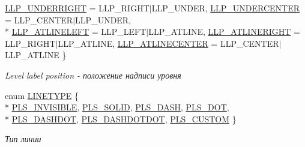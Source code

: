 \begin{DoxyCompactItemize}
\hyperlink{namespacexyplot_aa9c170d2faee24c85ccb4ae1b717cf6fa7056ae1976fd91d8da8738334dd15929}{L\-L\-P\-\_\-\-U\-N\-D\-E\-R\-R\-I\-G\-H\-T} = L\-L\-P\-\_\-\-R\-I\-G\-H\-T$\vert$\-L\-L\-P\-\_\-\-U\-N\-D\-E\-R, 
\hyperlink{namespacexyplot_aa9c170d2faee24c85ccb4ae1b717cf6fa082baefa8d7275b1aae57b461fe6785b}{L\-L\-P\-\_\-\-U\-N\-D\-E\-R\-C\-E\-N\-T\-E\-R} = L\-L\-P\-\_\-\-C\-E\-N\-T\-E\-R$\vert$\-L\-L\-P\-\_\-\-U\-N\-D\-E\-R, 
\\*
\hyperlink{namespacexyplot_aa9c170d2faee24c85ccb4ae1b717cf6fad082c1ad05eeb3c15e0c6b77d6cce9d4}{L\-L\-P\-\_\-\-A\-T\-L\-I\-N\-E\-L\-E\-F\-T} = L\-L\-P\-\_\-\-L\-E\-F\-T$\vert$\-L\-L\-P\-\_\-\-A\-T\-L\-I\-N\-E, 
\hyperlink{namespacexyplot_aa9c170d2faee24c85ccb4ae1b717cf6faa8ae07e99eba567ea01eb2664016d252}{L\-L\-P\-\_\-\-A\-T\-L\-I\-N\-E\-R\-I\-G\-H\-T} = L\-L\-P\-\_\-\-R\-I\-G\-H\-T$\vert$\-L\-L\-P\-\_\-\-A\-T\-L\-I\-N\-E, 
\hyperlink{namespacexyplot_aa9c170d2faee24c85ccb4ae1b717cf6fa12fe073bd3142bfa8d390720d3a76eff}{L\-L\-P\-\_\-\-A\-T\-L\-I\-N\-E\-C\-E\-N\-T\-E\-R} = L\-L\-P\-\_\-\-C\-E\-N\-T\-E\-R$\vert$\-L\-L\-P\-\_\-\-A\-T\-L\-I\-N\-E
 \}
\begin{DoxyCompactList}\small\item\em Level label position -\/ положение надписи уровня \end{DoxyCompactList}\item 
enum \hyperlink{namespacexyplot_a3d67107a3da8dc1ef0114ab0352e01ed}{L\-I\-N\-E\-T\-Y\-P\-E} \{ \\*
\hyperlink{namespacexyplot_a3d67107a3da8dc1ef0114ab0352e01edac5eb15757e77c3c52d0942614ec9f8be}{P\-L\-S\-\_\-\-I\-N\-V\-I\-S\-I\-B\-L\-E}, 
\hyperlink{namespacexyplot_a3d67107a3da8dc1ef0114ab0352e01eda50f3326c8ff8eb69d629156dfe2e268a}{P\-L\-S\-\_\-\-S\-O\-L\-I\-D}, 
\hyperlink{namespacexyplot_a3d67107a3da8dc1ef0114ab0352e01eda74e7892b4005a9d876d72af628580478}{P\-L\-S\-\_\-\-D\-A\-S\-H}, 
\hyperlink{namespacexyplot_a3d67107a3da8dc1ef0114ab0352e01edac34c12455dee71f7f163e9359dbad363}{P\-L\-S\-\_\-\-D\-O\-T}, 
\\*
\hyperlink{namespacexyplot_a3d67107a3da8dc1ef0114ab0352e01eda4dddb94c4db80cbcda7854561c840955}{P\-L\-S\-\_\-\-D\-A\-S\-H\-D\-O\-T}, 
\hyperlink{namespacexyplot_a3d67107a3da8dc1ef0114ab0352e01eda69289e8337cb99a0a62e97da57b2f4d1}{P\-L\-S\-\_\-\-D\-A\-S\-H\-D\-O\-T\-D\-O\-T}, 
\hyperlink{namespacexyplot_a3d67107a3da8dc1ef0114ab0352e01eda91a8cb39f706f05afa6e0745f8c0c53e}{P\-L\-S\-\_\-\-C\-U\-S\-T\-O\-M}
 \}
\begin{DoxyCompactList}\small\item\em Тип линии \end{DoxyCompactList}\item 

\end{DoxyCompactItemize}
